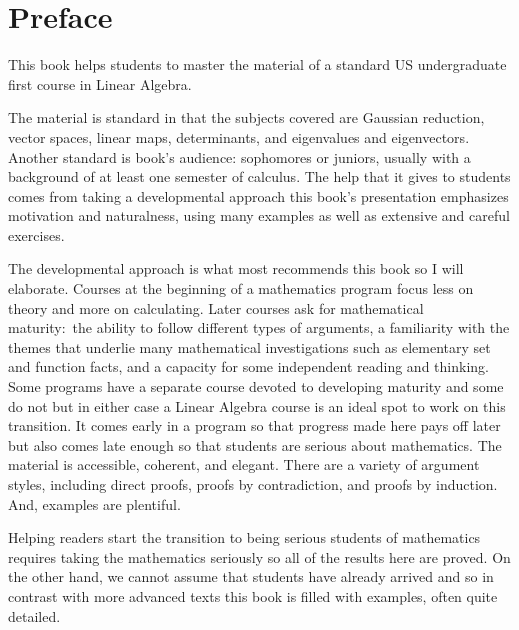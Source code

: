 {\setlength{\parskip}{.7ex}  %
\chapter*{Preface}
This book helps students to master the material of a standard 
US undergraduate first course in Linear Algebra.

The material is standard in that the subjects covered are
Gaussian reduction, 
vector spaces, linear maps,
determinants, and eigenvalues and eigenvectors.
Another standard is book's audience:
sophomores or juniors, usually with a background 
of at least one semester of calculus. 
The help that it gives to students comes from taking a developmental 
approach\Dash 
this book's presentation emphasizes motivation and naturalness, 
using many examples as well as extensive and careful exercises.

The developmental approach is what most recommends this book
so I will elaborate.
Courses at the beginning of a mathematics program
focus less on theory and more on calculating.
Later courses
ask for mathematical maturity:~the ability to follow different 
types of arguments, 
a familiarity with
the themes that underlie many mathematical investigations such as
elementary set and function facts,
and a capacity for some independent reading and thinking.
Some programs have a separate course devoted to developing maturity and
some do not but
in either case a Linear Algebra course 
is an ideal spot to work on this transition.
It comes early in a program so that progress made here pays off later
but also comes late enough so that
students are serious about mathematics.
The material is accessible, coherent, and elegant.
There are a variety of argument styles, including 
direct proofs, proofs by
contradiction, and proofs by induction.
And, examples are plentiful.

Helping readers start the transition to being serious students of 
mathematics
requires taking the mathematics seriously so
all of the results here are proved.
On the other hand, we cannot
assume that students have already arrived
and so 
in contrast with more advanced texts 
this book is filled with examples,
often quite detailed.

}
